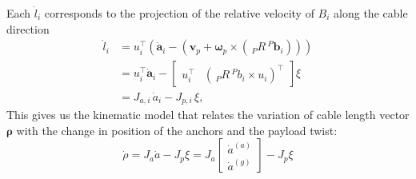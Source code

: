 Each $\dot{l}_i$ corresponds to the projection of the relative velocity of $B_i$ along the cable direction
\begin{equation}
\begin{aligned}
    \dot{l}_i 
    &= u_i^\top \left( 
        \dot{\boldsymbol{a}}_i 
        - \left( 
            \boldsymbol{v}_p 
            + \boldsymbol{\omega}_p \times (\, _P R \, ^P\boldsymbol{b}_i ) 
        \right) 
    \right) \\
    &= u_i^\top \dot{\boldsymbol{a}}_i 
    - 
    \begin{bmatrix}
        u_i^\top & (\, _P R \, ^P b_i \times u_i )^\top
    \end{bmatrix}
    \xi \\
    &= J_{a,i}\, \dot{a}_i - J_{p,i}\, \xi ,
\end{aligned}
\label{eq:cablelengthrate}
\end{equation}
This gives us the kinematic model that relates the variation of cable length vector $\boldsymbol{\rho}$ with the change in position of the anchors and the payload twist:
\begin{equation}
    \dot{\rho} = J_a \dot{a} - J_p \xi = J_a \begin{bmatrix}
        \dot{a}^{(a)} \\ \dot{a}^{(g)}
    \end{bmatrix} - J_p \xi
    \label{eq:kinematic_model}
\end{equation}

